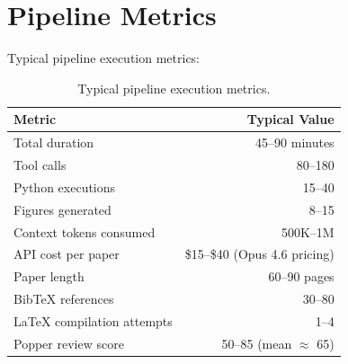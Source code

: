 \section{Pipeline Metrics}
\label{sec:pipeline:metrics}

Typical pipeline execution metrics:

\begin{table}[H]
\centering
\caption{Typical pipeline execution metrics.}
\label{tab:pipeline-metrics}
\begin{tabular}{lr}
\toprule
\textbf{Metric} & \textbf{Typical Value} \\
\midrule
Total duration & 45--90 minutes \\
Tool calls & 80--180 \\
Python executions & 15--40 \\
Figures generated & 8--15 \\
Context tokens consumed & 500K--1M \\
API cost per paper & \$15--\$40 (Opus 4.6 pricing) \\
Paper length & 60--90 pages \\
BibTeX references & 30--80 \\
\LaTeX{} compilation attempts & 1--4 \\
Popper review score & 50--85 (mean $\approx$ 65) \\
\bottomrule
\end{tabular}
\end{table}
